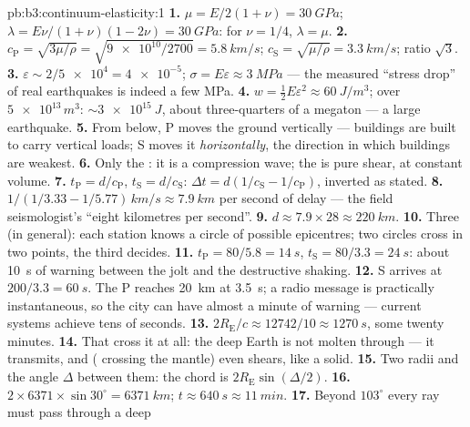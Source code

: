 \begin{solution}{pb:b3:continuum-elasticity:1}
\textbf{1.} $\mu = E/2(1+\nu) = \qty{30}{GPa}$; $\lambda =
E\nu/(1+\nu)(1-2\nu) = \qty{30}{GPa}$: for $\nu = 1/4$, $\lambda =
\mu$.
\textbf{2.} $c_{\text{P}} = \sqrt{3\mu/\rho} = \sqrt{\num{9e10}/2700}
= \qty{5.8}{km/s}$; $c_{\text{S}} = \sqrt{\mu/\rho} =
\qty{3.3}{km/s}$; ratio $\sqrt3$.
\textbf{3.} $\varepsilon \sim 2/\num{5e4} = \num{4e-5}$; $\sigma =
E\varepsilon \approx \qty{3}{MPa}$ --- the measured ``stress drop'' of
real earthquakes is indeed a few MPa.
\textbf{4.} $w = \tfrac12 E\varepsilon^2 \approx \qty{60}{J/m^3}$;
over $\num{5e13}{}\,\unit{m^3}$: $\sim\qty{3e15}{J}$, about
three-quarters of a megaton --- a large earthquake.
\textbf{5.} From below, P moves the ground vertically --- buildings
are built to carry vertical loads; S moves it \emph{horizontally},
the direction in which buildings are weakest.
\textbf{6.} Only the : it is a compression wave; the  is
pure shear, at constant volume.
\textbf{7.} $t_{\text{P}} = d/c_{\text{P}}$, $t_{\text{S}} =
d/c_{\text{S}}$: $\Delta t = d(1/c_{\text{S}} - 1/c_{\text{P}})$,
inverted as stated.
\textbf{8.} $1/(1/3.33 - 1/5.77)\,\unit{km/s} \approx
\qty{7.9}{km}$ per second of delay --- the field seismologist's
``eight kilometres per second''.
\textbf{9.} $d \approx 7.9 \times 28 \approx \qty{220}{km}$.
\textbf{10.} Three (in general): each station knows a circle of
possible epicentres; two circles cross in two points, the third
decides.
\textbf{11.} $t_{\text{P}} = 80/5.8 = \qty{14}{s}$, $t_{\text{S}} =
80/3.3 = \qty{24}{s}$: about \qty{10}{s} of warning between the jolt
and the destructive shaking.
\textbf{12.} S arrives at $200/3.3 = \qty{60}{s}$. The P reaches
\qty{20}{km} at \qty{3.5}{s}; a radio message is practically
instantaneous, so the city can have almost a minute of warning ---
current systems achieve tens of seconds.
\textbf{13.} $2R_{\text{E}}/c \approx 12742/10 \approx \qty{1270}{s}$,
some twenty minutes.
\textbf{14.} That  cross it at all: the deep Earth is not
molten through --- it transmits, and ( crossing the mantle)
even shears, like a solid.
\textbf{15.} Two radii and the angle $\Delta$ between them: the chord
is $2R_{\text{E}}\sin(\Delta/2)$.
\textbf{16.} $2 \times 6371 \times \sin30^\circ = \qty{6371}{km}$;
$t \approx \qty{640}{s} \approx \qty{11}{min}$.
\textbf{17.} Beyond $103^\circ$ every ray must pass through a deep

\end{solution}
